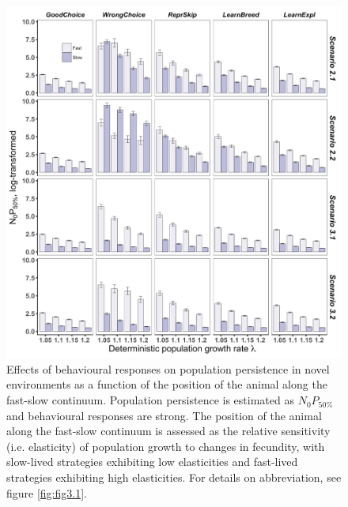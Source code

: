 \begin{figure}
\centering
\includegraphics[width=\textwidth]{./Figures/Appendix3_2/Fig_4.jpg}
\caption[Effects on $N_{0}P_{50\%}$ with strong behavioural responses]{
Effects of behavioural responses on population persistence in novel
environments as a function of the position of the animal along the fast-slow
continuum. Population persistence is estimated as $N_{0}P_{50\%}$ and
behavioural responses are strong. The position of the animal along the fast-slow
continuum is assessed as the relative sensitivity (i.e. elasticity) of
population growth to changes in fecundity, with slow-lived strategies exhibiting
low elasticities and fast-lived strategies exhibiting high elasticities. For
details on abbreviation, see figure \ref{fig:fig3.1}.}
\label{fig:figApp3.2.4}
\end{figure}

